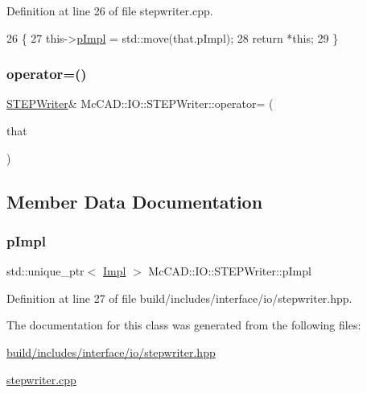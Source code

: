 Definition at line 26 of file stepwriter.\+cpp.


\begin{DoxyCode}
26                                              \{
27   this->\hyperlink{classMcCAD_1_1IO_1_1STEPWriter_af607286b2a18648c14ece6b8bc103db4}{pImpl} = std::move(that.pImpl);
28   \textcolor{keywordflow}{return} *\textcolor{keyword}{this};
29 \}
\end{DoxyCode}
\mbox{\label{classMcCAD_1_1IO_1_1STEPWriter_a777d708b50c4e9d344686643269d4fb8}} 
\subsubsection{\texorpdfstring{operator=()}{operator=()}\hspace{0.1cm}{\footnotesize\ttfamily [4/4]}}
{\footnotesize\ttfamily \hyperlink{classMcCAD_1_1IO_1_1STEPWriter}{S\+T\+E\+P\+Writer}\& Mc\+C\+A\+D\+::\+I\+O\+::\+S\+T\+E\+P\+Writer\+::operator= (\begin{DoxyParamCaption}\item[{\hyperlink{classMcCAD_1_1IO_1_1STEPWriter}{S\+T\+E\+P\+Writer} \&\&}]{that }\end{DoxyParamCaption})}



\subsection{Member Data Documentation}
\mbox{\label{classMcCAD_1_1IO_1_1STEPWriter_af607286b2a18648c14ece6b8bc103db4}} 
\subsubsection{\texorpdfstring{p\+Impl}{pImpl}}
{\footnotesize\ttfamily std\+::unique\+\_\+ptr$<$ \hyperlink{classMcCAD_1_1IO_1_1STEPWriter_1_1Impl}{Impl} $>$ Mc\+C\+A\+D\+::\+I\+O\+::\+S\+T\+E\+P\+Writer\+::p\+Impl\hspace{0.3cm}{\ttfamily [private]}}



Definition at line 27 of file build/includes/interface/io/stepwriter.\+hpp.



The documentation for this class was generated from the following files\+:\begin{DoxyCompactItemize}
\item 
\hyperlink{build_2includes_2interface_2io_2stepwriter_8hpp}{build/includes/interface/io/stepwriter.\+hpp}\item 
\hyperlink{stepwriter_8cpp}{stepwriter.\+cpp}\end{DoxyCompactItemize}
